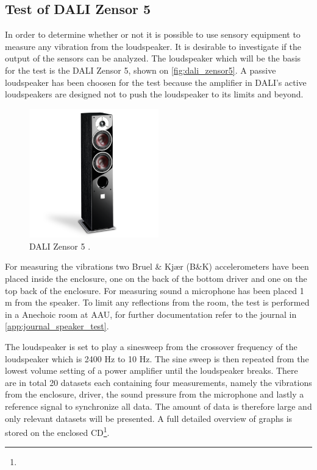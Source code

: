 \subsection*{Test of DALI Zensor 5}
In order to determine whether or not it is possible to use sensory equipment to measure any vibration from the loudspeaker. It is desirable to investigate if the output of the sensors can be analyzed. The loudspeaker which will be the basis for the test is the DALI Zensor 5, shown on \autoref{fig:dali_zensor5}. A passive loudspeaker has been choosen for the test because the amplifier in DALI's active loudspeakers are designed not to push the loudspeaker to its limits and beyond. %

\begin{figure}[H]
\centering
\includegraphics[width=0.5\textwidth]{figures/zensor5.png}
\caption{DALI Zensor 5 \citep{sou:daliZensor5}.}
\label{fig:dali_zensor5}
\end{figure}


For measuring the vibrations two Bruel \& Kjær (B\&K) accelerometers have been placed inside the enclosure, one on the back of the bottom driver and one on the top back of the enclosure. For measuring sound a microphone has been placed 1 m from the speaker. To limit any reflections from the room, the test is performed in a Anechoic room at \gls{AAU}, for further documentation refer to the journal in \autoref{app:journal_speaker_test}.  



The loudspeaker is set to play a sinesweep from the crossover frequency of the loudspeaker which is 2400 Hz to 10 Hz. The sine sweep is then repeated from the lowest volume setting of a power amplifier until the loudspeaker breaks. There are in total 20 datasets each containing four measurements, namely the vibrations from the enclosure, driver, the sound pressure from the microphone and lastly a reference signal to synchronize all data. The amount of data is therefore large and only relevant datasets will be presented.  A full detailed overview of graphs is stored on the enclosed CD\footnote{}.



